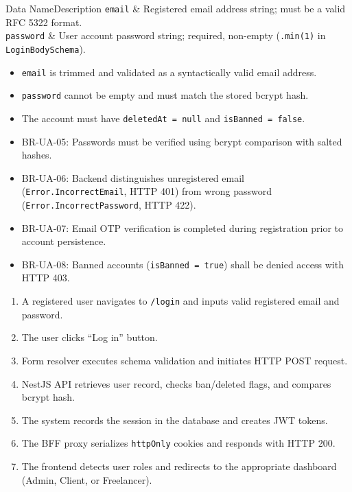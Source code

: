 
\begin{specdatatable}{Data Name}{Description}
\texttt{email} & Registered email address string; must be a valid RFC 5322 format.\\ \hline
\texttt{password} & User account password string; required, non-empty (\texttt{.min(1)} in \texttt{LoginBodySchema}).\\ \hline
\end{specdatatable}

\begin{itemize}[leftmargin=1.6em,topsep=3pt,itemsep=2pt,parsep=0pt,label=$\bullet$]
    \item \texttt{email} is trimmed and validated as a syntactically valid email address.
    \item \texttt{password} cannot be empty and must match the stored bcrypt hash.
    \item The account must have \texttt{deletedAt = null} and \texttt{isBanned = false}.
\end{itemize}

\begin{itemize}[leftmargin=1.6em,topsep=3pt,itemsep=2pt,parsep=0pt,label=$\bullet$]\brrulelist
    \item BR-UA-05: Passwords must be verified using bcrypt comparison with salted hashes.
    \item BR-UA-06: Backend distinguishes unregistered email (\texttt{Error.IncorrectEmail}, HTTP 401) from wrong password (\texttt{Error.IncorrectPassword}, HTTP 422).
    \item BR-UA-07: Email OTP verification is completed during registration prior to account persistence.
    \item BR-UA-08: Banned accounts (\texttt{isBanned = true}) shall be denied access with HTTP 403.
\end{itemize}

\begin{enumerate}[leftmargin=1.8em,topsep=3pt,itemsep=2pt,parsep=0pt]
    \item A registered user navigates to \texttt{/login} and inputs valid registered email and password.
    \item The user clicks ``Log in'' button.
    \item Form resolver executes schema validation and initiates HTTP POST request.
    \item NestJS API retrieves user record, checks ban/deleted flags, and compares bcrypt hash.
    \item The system records the session in the database and creates JWT tokens.
    \item The BFF proxy serializes \texttt{httpOnly} cookies and responds with HTTP 200.
    \item The frontend detects user roles and redirects to the appropriate dashboard (Admin, Client, or Freelancer).
\end{enumerate}

